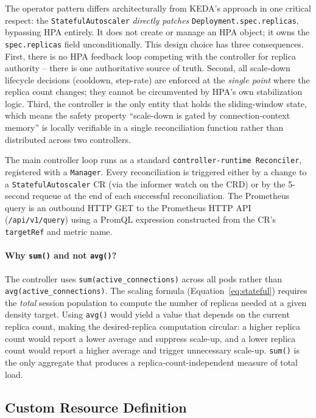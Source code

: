 \documentclass[twocolumn]{svjour3}
\begin{document}
The operator pattern differs architecturally from KEDA's approach in one critical respect:
the \texttt{StatefulAutoscaler} \textit{directly patches} \texttt{Deployment.spec.replicas},
bypassing HPA entirely. It does not create or manage an HPA object; it owns the
\texttt{spec.replicas} field unconditionally. This design choice has three consequences.
First, there is no HPA feedback loop competing with the controller for replica authority --
there is one authoritative source of truth. Second, all scale-down lifecycle decisions
(cooldown, step-rate) are enforced at the \textit{single point} where the replica count
changes; they cannot be circumvented by HPA's own stabilization logic. Third, the controller
is the only entity that holds the sliding-window state, which means the safety property
``scale-down is gated by connection-context memory'' is locally verifiable in a single
reconciliation function rather than distributed across two controllers.

The main controller loop runs as a standard \texttt{controller-runtime Reconciler},
registered with a \texttt{Manager}. Every reconciliation is triggered either by a change to
a \texttt{StatefulAutoscaler} CR (via the informer watch on the CRD) or by the 5-second
requeue at the end of each successful reconciliation. The Prometheus query is an outbound
HTTP GET to the Prometheus HTTP API (\texttt{/api/v1/query}) using a PromQL expression
constructed from the CR's \texttt{targetRef} and metric name.

\paragraph{Why \texttt{sum()} and not \texttt{avg()}?}
The controller uses \texttt{sum(active\_connections)} across all pods rather than
\texttt{avg(active\_connections)}. The scaling formula (Equation~\ref{eq:stateful}) requires
the \textit{total} session population to compute the number of replicas needed at a given
density target. Using \texttt{avg()} would yield a value that depends on the current replica
count, making the desired-replica computation circular: a higher replica count would report a
lower average and suppress scale-up, and a lower replica count would report a higher average
and trigger unnecessary scale-up. \texttt{sum()} is the only aggregate that produces a
replica-count-independent measure of total load.

\subsection{Custom Resource Definition}
\end{document}
